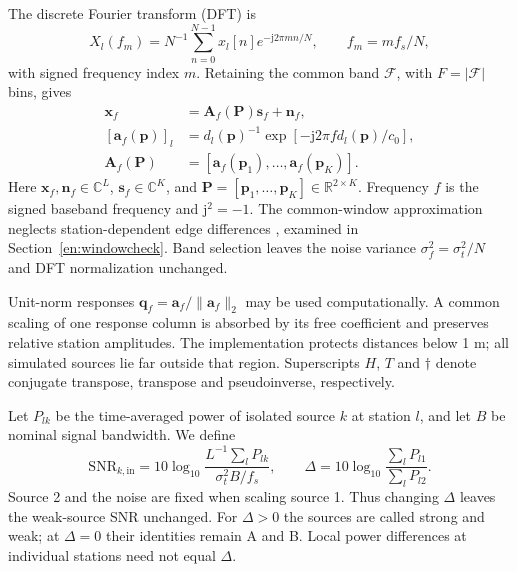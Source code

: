 \documentclass[a4paper,fleqn,review]{cas-sc}
\newcommand{\R}{\mathbb R}
\newcommand{\C}{\mathbb C}
\begin{document}
The discrete Fourier transform (DFT) is
\begin{equation}
X_l(f_m)=N^{-1}\sum_{n=0}^{N-1}x_l[n]e^{-\mathrm j2\pi mn/N},
\qquad f_m=mf_s/N,
\label{en:dft}
\end{equation}
with signed frequency index $m$. Retaining the common band $\mathcal F$, with $F=|\mathcal F|$ bins, gives
\begin{align}
\bm x_f&=\bm A_f(\bm P)\bm s_f+\bm n_f,\label{en:frequency}\\
[\bm a_f(\bm p)]_l&=d_l(\bm p)^{-1}
 \exp[-\mathrm j2\pi f d_l(\bm p)/c_0],\label{en:response}\\
\bm A_f(\bm P)&=[\bm a_f(\bm p_1),\ldots,\bm a_f(\bm p_K)].\nonumber
\end{align}
Here $\bm x_f,\bm n_f\in\C^L$, $\bm s_f\in\C^K$, and $\bm P=[\bm p_1,\ldots,\bm p_K]\in\R^{2\times K}$. Frequency $f$ is the signed baseband frequency and $\mathrm j^2=-1$. The common-window approximation neglects station-dependent edge differences \cite{ChenHudsonYao2002}, examined in Section~\ref{en:windowcheck}. Band selection leaves the noise variance $\sigma_f^2=\sigma_t^2/N$ and DFT normalization unchanged.

Unit-norm responses $\bm q_f=\bm a_f/\|\bm a_f\|_2$ may be used computationally. A common scaling of one response column is absorbed by its free coefficient and preserves relative station amplitudes. The implementation protects distances below 1 m; all simulated sources lie far outside that region. Superscripts $H$, $T$ and $\dagger$ denote conjugate transpose, transpose and pseudoinverse, respectively.

Let $P_{lk}$ be the time-averaged power of isolated source $k$ at station $l$, and let $B$ be nominal signal bandwidth. We define
\begin{equation}
\mathrm{SNR}_{k,\mathrm{in}}=10\log_{10}
 \frac{L^{-1}\sum_lP_{lk}}{\sigma_t^2 B/f_s},\qquad
\Delta=10\log_{10}\frac{\sum_lP_{l1}}{\sum_lP_{l2}}.
\label{en:snr}
\end{equation}
Source 2 and the noise are fixed when scaling source 1. Thus changing $\Delta$ leaves the weak-source SNR unchanged. For $\Delta>0$ the sources are called strong and weak; at $\Delta=0$ their identities remain A and B. Local power differences at individual stations need not equal $\Delta$.

\FloatBarrier
\end{document}
